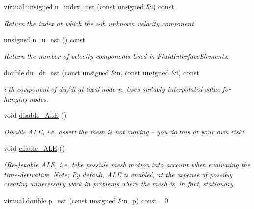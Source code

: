 \begin{DoxyCompactItemize}
virtual unsigned \hyperlink{classoomph_1_1NavierStokesEquations_a136756d3e5f4248b32ce44ecfcb5fb30}{u\+\_\+index\+\_\+nst} (const unsigned \&\hyperlink{cfortran_8h_adb50e893b86b3e55e751a42eab3cba82}{i}) const
\begin{DoxyCompactList}\small\item\em Return the index at which the i-\/th unknown velocity component. \end{DoxyCompactList}\item 
unsigned \hyperlink{classoomph_1_1NavierStokesEquations_ad71edf6c88f76be193e08f19f65f0a18}{n\+\_\+u\+\_\+nst} () const
\begin{DoxyCompactList}\small\item\em Return the number of velocity components Used in Fluid\+Interface\+Elements. \end{DoxyCompactList}\item 
double \hyperlink{classoomph_1_1NavierStokesEquations_ad8ffa0e111f4809e6544fbe4e477ed05}{du\+\_\+dt\+\_\+nst} (const unsigned \&n, const unsigned \&\hyperlink{cfortran_8h_adb50e893b86b3e55e751a42eab3cba82}{i}) const
\begin{DoxyCompactList}\small\item\em i-\/th component of du/dt at local node n. Uses suitably interpolated value for hanging nodes. \end{DoxyCompactList}\item 
void \hyperlink{classoomph_1_1NavierStokesEquations_a09f47fe68a941eaf9a0080a166eea687}{disable\+\_\+\+A\+LE} ()
\begin{DoxyCompactList}\small\item\em Disable A\+LE, i.\+e. assert the mesh is not moving -- you do this at your own risk! \end{DoxyCompactList}\item 
void \hyperlink{classoomph_1_1NavierStokesEquations_a8b3449281debf059f2386526f8b0ee24}{enable\+\_\+\+A\+LE} ()
\begin{DoxyCompactList}\small\item\em (Re-\/)enable A\+LE, i.\+e. take possible mesh motion into account when evaluating the time-\/derivative. Note\+: By default, A\+LE is enabled, at the expense of possibly creating unnecessary work in problems where the mesh is, in fact, stationary. \end{DoxyCompactList}\item 
virtual double \hyperlink{classoomph_1_1NavierStokesEquations_ae00a22f99df3630b3ab751a4453a7fd8}{p\+\_\+nst} (const unsigned \&n\+\_\+p) const =0

\end{DoxyCompactItemize}
